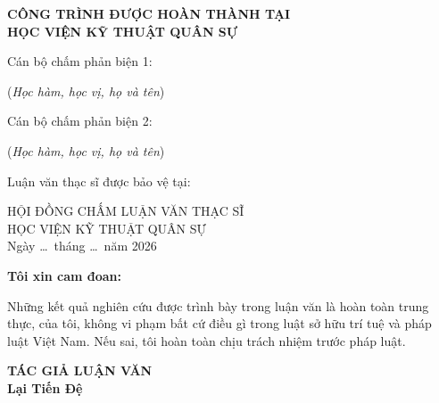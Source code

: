\documentclass[a4paper,14pt]{extreport}
\begin{document}
\newpage
\thispagestyle{empty}
\begin{center}
    \textbf{CÔNG TRÌNH ĐƯỢC HOÀN THÀNH TẠI}\\[0.3cm]
    \textbf{HỌC VIỆN KỸ THUẬT QUÂN SỰ}\\[1cm]
\end{center}

\noindent\hspace{1cm}Cán bộ chấm phản biện 1: \dotfill\\[0.3cm]
\begin{center}
    (\textit{Học hàm, học vị, họ và tên})
\end{center}

\noindent\hspace{1cm}Cán bộ chấm phản biện 2: \dotfill\\[0.3cm]
\begin{center}
    (\textit{Học hàm, học vị, họ và tên})
\end{center}

\vspace{1cm}
\noindent\hspace{1cm}Luận văn thạc sĩ được bảo vệ tại:

\vspace{0.5cm}
\begin{center}
    HỘI ĐỒNG CHẤM LUẬN VĂN THẠC SĨ\\
    HỌC VIỆN KỸ THUẬT QUÂN SỰ\\[0.3cm]
    Ngày \ldots\ tháng \ldots\ năm 2026
\end{center}

\newpage
\thispagestyle{empty}

\noindent\textbf{Tôi xin cam đoan:}

Những kết quả nghiên cứu được trình bày trong luận văn là hoàn toàn trung thực, của tôi, không vi phạm bất cứ điều gì trong luật sở hữu trí tuệ và pháp luật Việt Nam. Nếu sai, tôi hoàn toàn chịu trách nhiệm trước pháp luật.

\vspace{2cm}
\begin{center}
    \textbf{TÁC GIẢ LUẬN VĂN}\\[2cm]
    \textbf{Lại Tiến Đệ}
\end{center}
\end{document}
